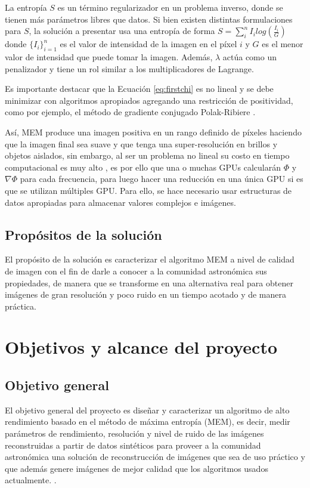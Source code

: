 La entropía $S$ es un término regularizador en un problema inverso, donde se tienen más parámetros libres que datos. Si bien existen distintas formulaciones para $S$, la solución a presentar usa una entropía de forma $S = \sum_{i}^{n} I_{i}log(\frac{I_{i}}{G})$ donde $\{I_{i}\}_{i=1}^{n}$ es el valor de intensidad de la imagen en el píxel $i$ y $G$ es el menor valor de intensidad que puede tomar la imagen. Además, $\lambda$ actúa como un penalizador y tiene un rol similar a los multiplicadores de Lagrange.

 
Es importante destacar que la Ecuación \ref{eq:firstchi} es no lineal y se debe minimizar con algoritmos apropiados agregando una restricción de positividad, como por ejemplo, el método de gradiente conjugado Polak-Ribiere \citep{polak}.

Así, MEM produce una imagen positiva en un rango definido de píxeles haciendo que la imagen final sea suave y que tenga una super-resolución en brillos y objetos aislados, sin embargo, al ser un problema no lineal su costo en tiempo computacional es muy alto \citep{libroAstro2}, es por ello que una o muchas GPUs calcularán $\Phi$ y $\nabla\Phi$ para cada frecuencia, para luego hacer una reducción en una única GPU si es que se utilizan múltiples GPU. Para ello, se hace necesario usar estructuras de datos apropiadas para almacenar valores complejos e imágenes.

\subsection{Propósitos de la solución}
El propósito de la solución es caracterizar el algoritmo MEM a nivel de calidad de imagen con el fin de darle a conocer a la comunidad astronómica sus propiedades, de manera que se transforme en una alternativa real para obtener imágenes de gran resolución y poco ruido en un tiempo acotado y de manera práctica.


\section{Objetivos y alcance del proyecto}
\label{intro:objetivos}

\subsection{Objetivo general}
El objetivo general del proyecto es diseñar y caracterizar un algoritmo de alto rendimiento basado en el método de máxima entropía (MEM), es decir, medir parámetros de rendimiento, resolución y nivel de ruido de las imágenes reconstruidas a partir de datos sintéticos para proveer a la comunidad astronómica una solución de reconstrucción de imágenes que sea de uso práctico y que además genere imágenes de mejor calidad que los algoritmos usados actualmente.
.

